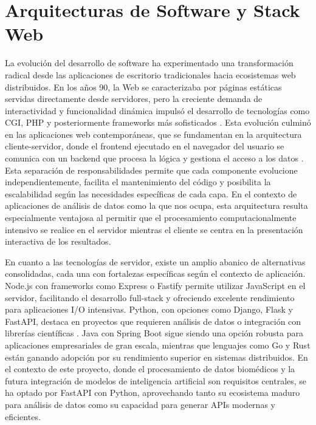 \section{Arquitecturas de Software y  Stack Web}

La evolución del desarrollo de software ha experimentado una transformación radical desde las aplicaciones de escritorio tradicionales hacia ecosistemas web distribuidos. En los años 90, la Web se caracterizaba por páginas estáticas servidas directamente desde servidores, pero la creciente demanda de interactividad y funcionalidad dinámica impulsó el desarrollo de tecnologías como CGI, PHP y posteriormente frameworks más sofisticados \cite{Ritesh2023_WebEvolution}. Esta evolución culminó en las aplicaciones web contemporáneas, que se fundamentan en la arquitectura cliente-servidor, donde el frontend ejecutado en el navegador del usuario se comunica con un backend que procesa la lógica y gestiona el acceso a los datos \cite{Nyabuto2024_ClientServer}. Esta separación de responsabilidades permite que cada componente evolucione independientemente, facilita el mantenimiento del código y posibilita la escalabilidad según las necesidades específicas de cada capa. En el contexto de aplicaciones de análisis de datos como la que nos ocupa, esta arquitectura resulta especialmente ventajosa al permitir que el procesamiento computacionalmente intensivo se realice en el servidor mientras el cliente se centra en la presentación interactiva de los resultados.

En cuanto a las tecnologías de servidor, existe un amplio abanico de alternativas consolidadas, cada una con fortalezas específicas según el contexto de aplicación. Node.js con frameworks como Express o Fastify permite utilizar JavaScript en el servidor, facilitando el desarrollo full-stack y ofreciendo excelente rendimiento para aplicaciones I/O intensivas. Python, con opciones como Django, Flask y FastAPI, destaca en proyectos que requieren análisis de datos o integración con librerías científicas \cite{Castro2023_PythonDataScience}. Java con Spring Boot sigue siendo una opción robusta para aplicaciones empresariales de gran escala, mientras que lenguajes como Go y Rust están ganando adopción por su rendimiento superior en sistemas distribuidos. En el contexto de este proyecto, donde el procesamiento de datos biomédicos y la futura integración de modelos de inteligencia artificial son requisitos centrales, se ha optado por FastAPI con Python, aprovechando tanto su ecosistema maduro para análisis de datos como su capacidad para generar APIs modernas y eficientes.

